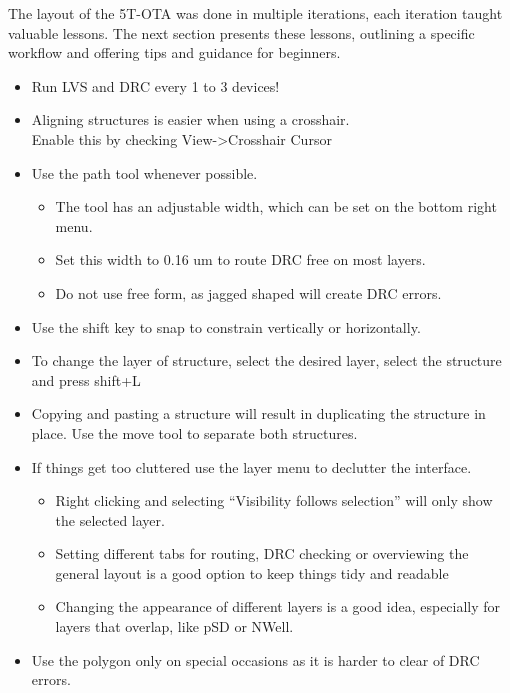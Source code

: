 \documentclass[
  letterpaper,
]{scrbook}
\begin{document}
The layout of the 5T-OTA was done in multiple iterations, each iteration
taught valuable lessons. The next section presents these lessons,
outlining a specific workflow and offering tips and guidance for
beginners.

\begin{tcolorbox}[enhanced jigsaw, title=\textcolor{quarto-callout-tip-color}{\faLightbulb}\hspace{0.5em}{Tips and tricks for the Layout Process.}, colback=white, bottomrule=.15mm, coltitle=black, colbacktitle=quarto-callout-tip-color!10!white, toptitle=1mm, colframe=quarto-callout-tip-color-frame, rightrule=.15mm, arc=.35mm, leftrule=.75mm, bottomtitle=1mm, titlerule=0mm, toprule=.15mm, opacitybacktitle=0.6, opacityback=0, left=2mm, breakable]

\begin{itemize}
\item
  Run LVS and DRC every 1 to 3 devices!
\item
  Aligning structures is easier when using a crosshair.\\
  Enable this by checking View-\textgreater Crosshair Cursor
\item
  Use the path tool whenever possible.

  \begin{itemize}
  \item
    The tool has an adjustable width, which can be set on the bottom
    right menu.
  \item
    Set this width to 0.16 um to route DRC free on most layers.
  \item
    Do not use free form, as jagged shaped will create DRC errors.
  \end{itemize}
\item
  Use the shift key to snap to constrain vertically or horizontally.
\item
  To change the layer of structure, select the desired layer, select the
  structure and press shift+L
\item
  Copying and pasting a structure will result in duplicating the
  structure in place. Use the move tool to separate both structures.
\item
  If things get too cluttered use the layer menu to declutter the
  interface.

  \begin{itemize}
  \item
    Right clicking and selecting ``Visibility follows selection'' will
    only show the selected layer.
  \item
    Setting different tabs for routing, DRC checking or overviewing the
    general layout is a good option to keep things tidy and readable
  \item
    Changing the appearance of different layers is a good idea,
    especially for layers that overlap, like pSD or NWell.
  \end{itemize}
\item
  Use the polygon only on special occasions as it is harder to clear of
  DRC errors.
\end{itemize}


\end{tcolorbox}
\end{document}
